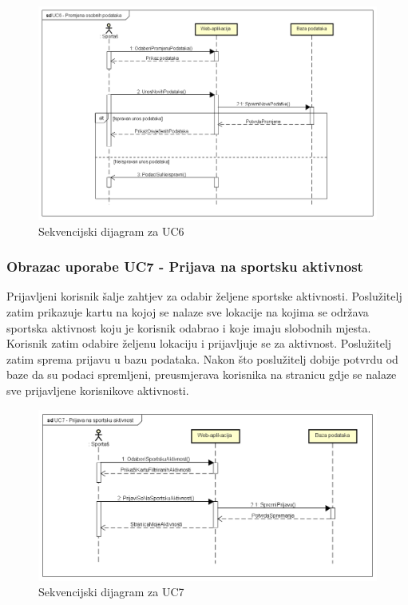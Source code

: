 				\begin{figure}[H]
					\includegraphics[width=\textwidth]{slike/UC6_SEKV_DIJ.png}
					\caption{Sekvencijski dijagram za UC6}
				\end{figure}
			
				\subsubsection{Obrazac uporabe UC7 - Prijava na sportsku aktivnost}
				Prijavljeni korisnik šalje zahtjev za odabir željene sportske aktivnosti. Poslužitelj zatim prikazuje kartu na kojoj se nalaze sve lokacije na kojima se održava sportska aktivnost koju je korisnik odabrao i koje imaju slobodnih mjesta. Korisnik zatim odabire željenu lokaciju i prijavljuje se za aktivnost. Poslužitelj zatim sprema prijavu u bazu podataka. Nakon što poslužitelj dobije potvrdu od baze da su podaci spremljeni, preusmjerava korisnika na stranicu gdje se nalaze sve prijavljene korisnikove aktivnosti. 
				
				\begin{figure}[H]
					\includegraphics[width=\textwidth]{slike/UC7_SEKV_DIJ.png}
					\caption{Sekvencijski dijagram za UC7}
				\end{figure}
			
